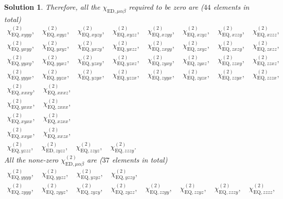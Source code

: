 \documentclass[UTF8,10pt,a4paper]{article}
\theoremstyle{Problem}
\theoremstyle{Solution}
\newtheorem*{sol}{Solution}
\begin{document}
\begin{sol}
    Therefore, all the $\chi_{\text{ED},\mu\alpha\beta}$ required to be zero are ($44$ elements in total)
    \small
    \begin{gather*}
        \chi_{\text{EQ},xyyy}^{(2)},\quad\chi_{\text{EQ},xyyz}^{(2)},\quad\chi_{\text{EQ},xyzy}^{(2)},\quad\chi_{\text{EQ},xyzz}^{(2)},\quad\chi_{\text{EQ},xzyy}^{(2)},\quad\chi_{\text{EQ},xzyz}^{(2)},\quad\chi_{\text{EQ},xzzy}^{(2)},\quad\chi_{\text{EQ},xzzz}^{(2)},\\
        \chi_{\text{EQ},yxyy}^{(2)},\quad\chi_{\text{EQ},yxyz}^{(2)},\quad\chi_{\text{EQ},yxzy}^{(2)},\quad\chi_{\text{EQ},yxzz}^{(2)},\quad\chi_{\text{EQ},zxyy}^{(2)},\quad\chi_{\text{EQ},zxyz}^{(2)},\quad\chi_{\text{EQ},zxzy}^{(2)},\quad\chi_{\text{EQ},zxzz}^{(2)},\\
        \chi_{\text{EQ},yyxy}^{(2)},\quad\chi_{\text{EQ},yyxz}^{(2)},\quad\chi_{\text{EQ},yzxy}^{(2)},\quad\chi_{\text{EQ},yzxz}^{(2)},\quad\chi_{\text{EQ},zyxy}^{(2)},\quad\chi_{\text{EQ},zyxz}^{(2)},\quad\chi_{\text{EQ},zzxy}^{(2)},\quad\chi_{\text{EQ},zzxz}^{(2)},\\
        \chi_{\text{EQ},yyyx}^{(2)},\quad\chi_{\text{EQ},yyzx}^{(2)},\quad\chi_{\text{EQ},yzyx}^{(2)},\quad\chi_{\text{EQ},yzzx}^{(2)},\quad\chi_{\text{EQ},zyyx}^{(2)},\quad\chi_{\text{EQ},zyzx}^{(2)},\quad\chi_{\text{EQ},zzyx}^{(2)},\quad\chi_{\text{EQ},zzzx}^{(2)},\\
        \chi_{\text{EQ},xxxy}^{(2)},\quad\chi_{\text{EQ},xxxz}^{(2)},\\
        \chi_{\text{EQ},yxxx}^{(2)},\quad\chi_{\text{EQ},zxxx}^{(2)},\\
        \chi_{\text{EQ},xyxx}^{(2)},\quad\chi_{\text{EQ},xzxx}^{(2)},\\
        \chi_{\text{EQ},xxyx}^{(2)},\quad\chi_{\text{EQ},xxzx}^{(2)},\\
        \chi_{\text{EQ},yzzz}^{(2)},\quad\chi_{\text{ED},zyzz}^{(2)},\quad\chi_{\text{EQ},zzyz}^{(2)},\quad\chi_{\text{EQ},zzzy}^{(2)}.
    \end{gather*}
    \normalsize
    All the none-zero $\chi_{\text{ED},\mu\alpha\beta}^{(2)}$ are ($37$ elements in total)
    \begin{gather*}
        \chi_{\text{EQ},yyyy}^{(2)},\quad\chi_{\text{EQ},yyzz}^{(2)},\quad\chi_{\text{EQ},yzyz}^{(2)},\quad\chi_{\text{EQ},yzzy}^{(2)},\\
        \chi_{\text{EQ},zyyy}^{(2)},\quad\chi_{\text{EQ},zyyz}^{(2)},\quad\chi_{\text{EQ},zyzy}^{(2)},\quad\chi_{\text{EQ},zyzz}^{(2)},\quad\chi_{\text{EQ},zzyy}^{(2)},\quad\chi_{\text{EQ},zzyz}^{(2)},\quad\chi_{\text{EQ},zzzy}^{(2)},\quad\chi_{\text{EQ},zzzz}^{(2)},\\

\end{gather*}
\end{sol}
\end{document}
